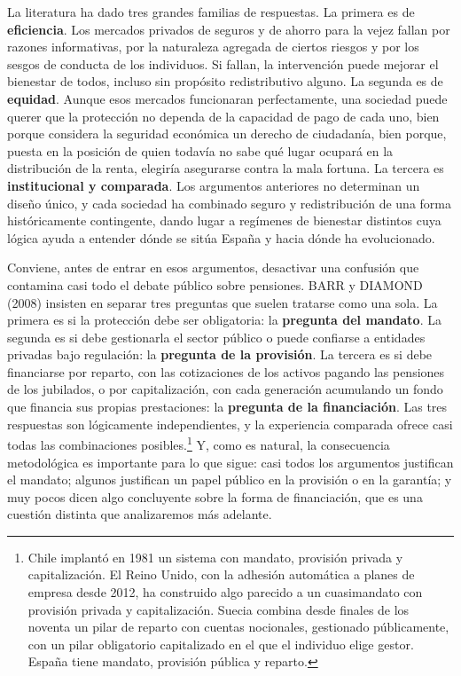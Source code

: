 \documentclass[10pt,a4paper]{article}
\begin{document}
La literatura ha dado tres grandes familias de respuestas. La primera es de \textbf{eficiencia}. Los mercados privados de seguros y de ahorro para la vejez fallan por razones informativas, por la naturaleza agregada de ciertos riesgos y por los sesgos de conducta de los individuos. Si fallan, la intervención puede mejorar el bienestar de todos, incluso sin propósito redistributivo alguno. La segunda es de \textbf{equidad}. Aunque esos mercados funcionaran perfectamente, una sociedad puede querer que la protección no dependa de la capacidad de pago de cada uno, bien porque considera la seguridad económica un derecho de ciudadanía, bien porque, puesta en la posición de quien todavía no sabe qué lugar ocupará en la distribución de la renta, elegiría asegurarse contra la mala fortuna. La tercera es \textbf{institucional y comparada}. Los argumentos anteriores no determinan un diseño único, y cada sociedad ha combinado seguro y redistribución de una forma históricamente contingente, dando lugar a regímenes de bienestar distintos cuya lógica ayuda a entender dónde se sitúa España y hacia dónde ha evolucionado.

Conviene, antes de entrar en esos argumentos, desactivar una confusión que contamina casi todo el debate público sobre pensiones. BARR y DIAMOND (2008) insisten en separar tres preguntas que suelen tratarse como una sola. La primera es si la protección debe ser obligatoria: la \textbf{pregunta del mandato}. La segunda es si debe gestionarla el sector público o puede confiarse a entidades privadas bajo regulación: la \textbf{pregunta de la provisión}. La tercera es si debe financiarse por reparto, con las cotizaciones de los activos pagando las pensiones de los jubilados, o por capitalización, con cada generación acumulando un fondo que financia sus propias prestaciones: la \textbf{pregunta de la financiación}. Las tres respuestas son lógicamente independientes, y la experiencia comparada ofrece casi todas las combinaciones posibles.\footnote{%
    Chile implantó en 1981 un sistema con mandato, provisión privada y capitalización. El Reino Unido, con la adhesión automática a planes de empresa desde 2012, ha construido algo parecido a un cuasimandato con provisión privada y capitalización. Suecia combina desde finales de los noventa un pilar de reparto con cuentas nocionales, gestionado públicamente, con un pilar obligatorio capitalizado en el que el individuo elige gestor. España tiene mandato, provisión pública y reparto.
} Y, como es natural, la consecuencia metodológica es importante para lo que sigue: casi todos los argumentos justifican el mandato; algunos justifican un papel público en la provisión o en la garantía; y muy pocos dicen algo concluyente sobre la forma de financiación, que es una cuestión distinta que analizaremos más adelante.
\end{document}
